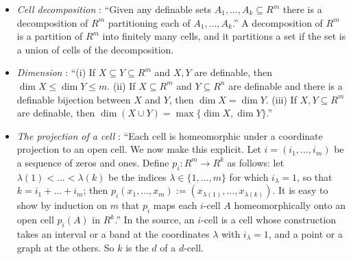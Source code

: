 \documentclass[10pt]{article}
\theoremstyle{definition}
\theoremstyle{remark}
\begin{document}
\begin{itemize}
\item \emph{Cell decomposition} \citep[Chapter~3, (2.11), first part]{vandendries1998tame}: ``Given any definable sets $A_1, \dots, A_k \subseteq R^m$ there is a decomposition of $R^m$ partitioning each of $A_1, \dots, A_k$.'' A decomposition of $R^m$ is a partition of $R^m$ into finitely many cells, and it partitions a set if the set is a union of cells of the decomposition.
\item \emph{Dimension} \citep[Chapter~4, Proposition~(1.3)]{vandendries1998tame}: ``(i) If $X \subseteq Y \subseteq R^m$ and $X, Y$ are definable, then $\dim X \le \dim Y \le m$. (ii) If $X \subseteq R^m$ and $Y \subseteq R^n$ are definable and there is a definable bijection between $X$ and $Y$, then $\dim X = \dim Y$. (iii) If $X, Y \subseteq R^m$ are definable, then $\dim(X \cup Y) = \max\{\dim X, \dim Y\}$.''
\item \emph{The projection of a cell} \citep[Chapter~3, (2.7)]{vandendries1998tame}: ``Each cell is homeomorphic under a coordinate projection to an open cell. We now make this explicit. Let $i = (i_1, \dots, i_m)$ be a sequence of zeros and ones. Define $p_i : R^m \to R^k$ as follows: let $\lambda(1) < \dots < \lambda(k)$ be the indices $\lambda \in \{1, \dots, m\}$ for which $i_\lambda = 1$, so that $k = i_1 + \dots + i_m$; then $p_i(x_1, \dots, x_m) := (x_{\lambda(1)}, \dots, x_{\lambda(k)})$. It is easy to show by induction on $m$ that $p_i$ maps each $i$-cell $A$ homeomorphically onto an open cell $p_i(A)$ in $R^k$.'' In the source, an $i$-cell is a cell whose construction takes an interval or a band at the coordinates $\lambda$ with $i_\lambda = 1$, and a point or a graph at the others. So $k$ is the $d$ of a $d$-cell.
\end{itemize}
\end{document}
